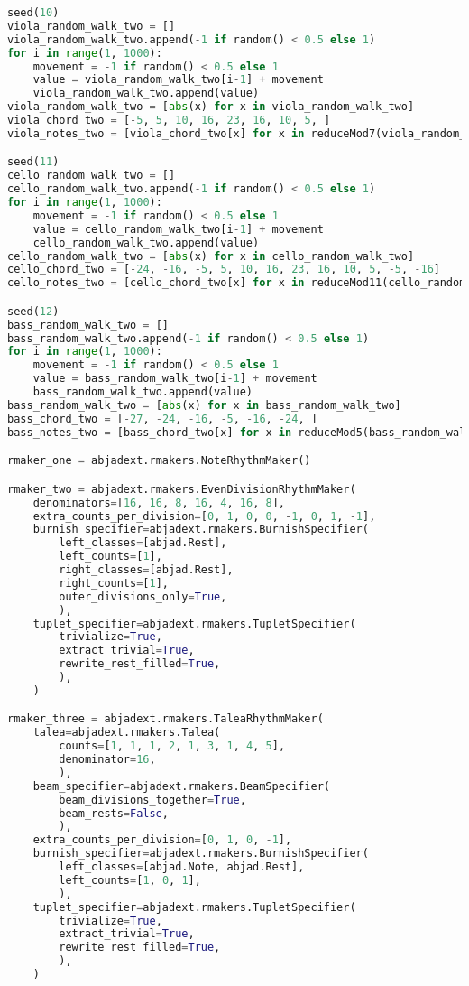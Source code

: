 \begin{lstlisting}[language=Python, caption=Tianshu Segment\_I]
seed(10)
viola_random_walk_two = []
viola_random_walk_two.append(-1 if random() < 0.5 else 1)
for i in range(1, 1000):
    movement = -1 if random() < 0.5 else 1
    value = viola_random_walk_two[i-1] + movement
    viola_random_walk_two.append(value)
viola_random_walk_two = [abs(x) for x in viola_random_walk_two]
viola_chord_two = [-5, 5, 10, 16, 23, 16, 10, 5, ]
viola_notes_two = [viola_chord_two[x] for x in reduceMod7(viola_random_walk_two)]

seed(11)
cello_random_walk_two = []
cello_random_walk_two.append(-1 if random() < 0.5 else 1)
for i in range(1, 1000):
    movement = -1 if random() < 0.5 else 1
    value = cello_random_walk_two[i-1] + movement
    cello_random_walk_two.append(value)
cello_random_walk_two = [abs(x) for x in cello_random_walk_two]
cello_chord_two = [-24, -16, -5, 5, 10, 16, 23, 16, 10, 5, -5, -16]
cello_notes_two = [cello_chord_two[x] for x in reduceMod11(cello_random_walk_two)]

seed(12)
bass_random_walk_two = []
bass_random_walk_two.append(-1 if random() < 0.5 else 1)
for i in range(1, 1000):
    movement = -1 if random() < 0.5 else 1
    value = bass_random_walk_two[i-1] + movement
    bass_random_walk_two.append(value)
bass_random_walk_two = [abs(x) for x in bass_random_walk_two]
bass_chord_two = [-27, -24, -16, -5, -16, -24, ]
bass_notes_two = [bass_chord_two[x] for x in reduceMod5(bass_random_walk_two)]

rmaker_one = abjadext.rmakers.NoteRhythmMaker()

rmaker_two = abjadext.rmakers.EvenDivisionRhythmMaker(
    denominators=[16, 16, 8, 16, 4, 16, 8],
    extra_counts_per_division=[0, 1, 0, 0, -1, 0, 1, -1],
    burnish_specifier=abjadext.rmakers.BurnishSpecifier(
        left_classes=[abjad.Rest],
        left_counts=[1],
        right_classes=[abjad.Rest],
        right_counts=[1],
        outer_divisions_only=True,
        ),
    tuplet_specifier=abjadext.rmakers.TupletSpecifier(
        trivialize=True,
        extract_trivial=True,
        rewrite_rest_filled=True,
        ),
    )

rmaker_three = abjadext.rmakers.TaleaRhythmMaker(
    talea=abjadext.rmakers.Talea(
        counts=[1, 1, 1, 2, 1, 3, 1, 4, 5],
        denominator=16,
        ),
    beam_specifier=abjadext.rmakers.BeamSpecifier(
        beam_divisions_together=True,
        beam_rests=False,
        ),
    extra_counts_per_division=[0, 1, 0, -1],
    burnish_specifier=abjadext.rmakers.BurnishSpecifier(
        left_classes=[abjad.Note, abjad.Rest],
        left_counts=[1, 0, 1],
        ),
    tuplet_specifier=abjadext.rmakers.TupletSpecifier(
        trivialize=True,
        extract_trivial=True,
        rewrite_rest_filled=True,
        ),
    )


\end{lstlisting}
